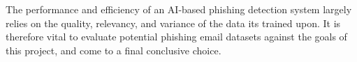 
The performance and efficiency of an AI-based phishing detection system largely relies on the quality, relevancy, and variance of the data its trained upon. It is therefore vital to evaluate potential phishing email datasets against the goals of this project, and come to a final conclusive choice.
